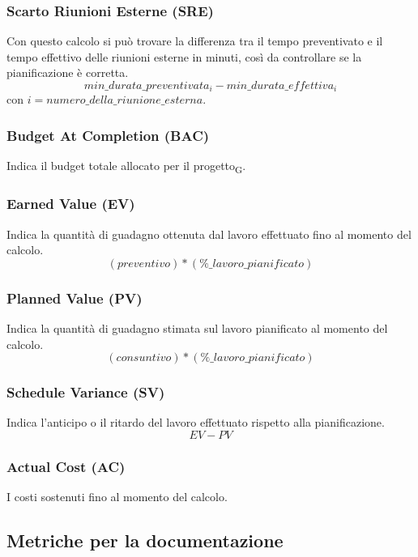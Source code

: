 \subsubsection{Scarto Riunioni Esterne (SRE)}
Con questo calcolo si può trovare la differenza tra il tempo preventivato e il tempo effettivo delle riunioni esterne in minuti, così da controllare se la pianificazione è corretta.
\[min\_durata\_preventivata_i-min\_durata\_effettiva_i\]
con $i = {numero\_della\_riunione\_esterna}$.
\subsubsection{Budget At Completion (BAC)}
Indica il budget totale allocato per il progetto\textsubscript{G}.

\subsubsection{Earned Value (EV)}
Indica la quantità di guadagno ottenuta dal lavoro effettuato fino al momento del calcolo.
\[
    (preventivo)*(\%\_lavoro\_pianificato)
\]

\subsubsection{Planned Value (PV)}
Indica la quantità di guadagno stimata sul lavoro pianificato al momento del calcolo.
\[
    (consuntivo)*(\%\_lavoro\_pianificato)
\]

\subsubsection{Schedule Variance (SV)}
Indica l'anticipo o il ritardo del lavoro effettuato rispetto alla pianificazione.
\[
    EV - PV
\]

\subsubsection{Actual Cost (AC)}
I costi sostenuti fino al momento del calcolo.


\subsection{Metriche per la documentazione}

